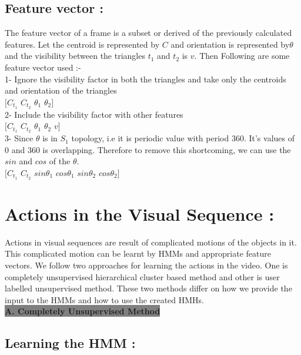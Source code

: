 \def\DevnagVersion{2.15}\documentclass[a4paper, 10pt, notitlepage]{report}
\begin{document}
\subsection{Feature vector :}
The feature vector of a frame is a subset or derived of the previously calculated features. Let the centroid is represented by $C$ and orientation is represented by$\theta$ and the visibility between the triangles $t_1$ and $t_2$ is $v$. Then Following are some feature vector used :-\\

1- Ignore the visibility factor in both the triangles and take only the centroids and orientation of the triangles \\
\hspace*{20pt} $[C_{t_1}$ $C_{t_2}$ $\theta_1$ $\theta_2]$\\
2- Include the visibility factor with other features\\
\hspace*{20pt} $[C_{t_1}$ $C_{t_2}$ $\theta_1$ $\theta_2$ $v]$\\
3- Since $\theta$ is in $S_1$ topology, i.e it is periodic value with period $360$. It's values of $0$ and $360$ is overlapping. Therefore to remove this shortcoming, we can use the $sin$ and $cos$ of the $\theta$.\\
\hspace*{20pt} $[C_{t_1}$  $C_{t_2}$  $sin\theta_1$  $cos\theta_1$  $sin\theta_2$  $cos\theta_2]$\\

\section{Actions in the Visual Sequence :}
Actions in visual sequences are result of complicated motions of the objects in it. This complicated motion can be learnt by HMMs and appropriate feature vectors. We follow two approaches for learning the actions in the video. One is completely unsupervised hierarchical cluster based method and other is user labelled unsupervised method. These two methods differ on how we provide the input to the HMMs and how to use the created HMHs.\\

\colorbox{gray}{\Large \bf A. Completely Unsupervised Method} 

\subsection{Learning the HMM :}
\end{document}
